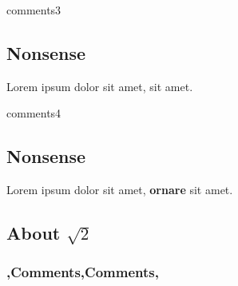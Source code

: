 \begin{saveblock}{comments3}
	\begin{highlightblock}[linewidth=0.6\textwidth,gobble=8]
		\section{Nonsense}

		Lorem ipsum dolor sit amet,
		 sit amet.
		
	\end{highlightblock}
\end{saveblock}

\begin{saveblock}{comments4}
	\begin{highlightblock}[linewidth=0.6\textwidth,gobble=8]
		\section{Nonsense}

		Lorem ipsum dolor sit amet,
		\textbf{ornare} sit amet.
		
		\subsection{About $\sqrt{2}$}
	\end{highlightblock}
\end{saveblock}

\def\frameSelection{2}

	\def\frameSelection{1-}
\endDetail

\beginFrameWithSelection{\frameSelection}
	\frametitle{\lang,Comments,Comments,}


